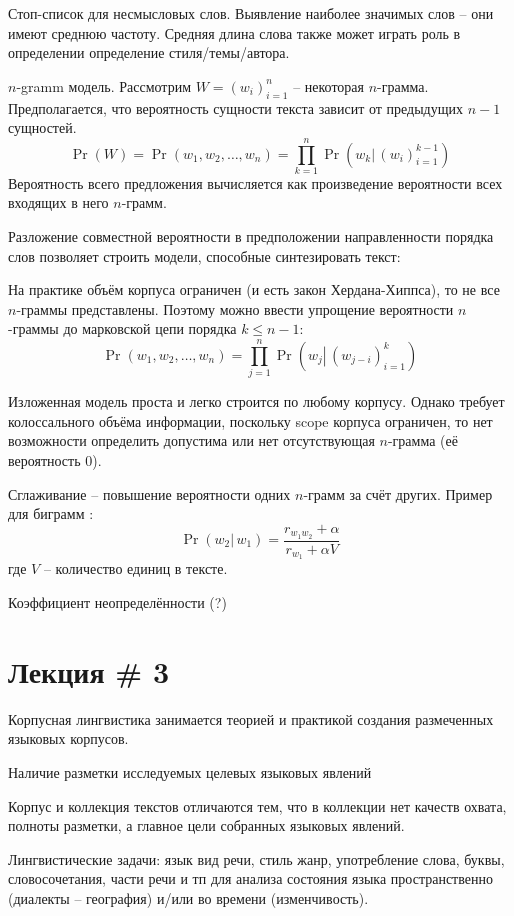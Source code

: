 \documentclass[a4paper]{article}
\newcommand{\brac}[1]{{\left ( #1 \right )}}
\newcommand{\induc}[1]{{\left . #1 \right \vert}}
\newcommand{\eng}[1]{\foreignlanguage{english}{#1}}
\begin{document}
Стоп-список для несмысловых слов.
Выявление наиболее значимых слов -- они имеют среднюю частоту.
Средняя длина слова также может играть роль в определении определение стиля/темы/автора.

$n$\eng{-gramm} модель.
Рассмотрим $W = \brac{w_i}_{i=1}^n$ -- некоторая $n$-грамма.
Предполагается, что вероятность сущности текста зависит от предыдущих $n-1$ сущностей.
\[ \Pr(W) = \Pr\brac{w_1,w_2,\ldots,w_n} = \prod_{k=1}^n \Pr\brac{\induc{w_k}\,\brac{w_i}_{i=1}^{k-1}}\]
Вероятность всего предложения вычисляется как произведение вероятности всех входящих в него $n$-грамм.

Разложение совместной вероятности в предположении направленности порядка слов позволяет строить модели, способные синтезировать текст:

На практике объём корпуса ограничен (и есть закон Хердана-Хиппса), то не все $n$-граммы представлены.
Поэтому можно ввести упрощение вероятности $n$-граммы до марковской цепи порядка $k\leq n-1$:
\[\Pr\brac{w_1,w_2,\ldots,w_n} = \prod_{j=1}^n \Pr\brac{\induc{w_j}\,\brac{w_{j-i}}_{i=1}^k}\]

Изложенная модель проста и легко строится по любому корпусу.
Однако требует колоссального объёма информации, поскольку \eng{scope} корпуса ограничен,
то нет возможности определить допустима или нет отсутствующая $n$-грамма (её вероятность $0$).

Сглаживание -- повышение вероятности одних $n$-грамм за счёт других.
Пример для биграмм : \[\Pr\brac{\induc{w_2}\, w_1} = \frac{r_{w_1w_2}+\alpha}{r_{w_1}+\alpha V}\]
где $V$ -- количество единиц в тексте.

Коэффициент неопределённости (?)



\section{Лекция \# 3} %
\label{sec:lecture_3}

Корпусная лингвистика занимается теорией и практикой создания размеченных языковых корпусов.

Наличие разметки исследуемых целевых языковых явлений

Корпус и коллекция текстов отличаются тем, что в коллекции нет качеств охвата, полноты разметки, а главное цели собранных языковых явлений.

Лингвистические задачи: язык вид речи, стиль жанр, употребление слова, буквы, словосочетания, части речи и тп для анализа состояния языка пространственно (диалекты -- география) и/или во времени (изменчивость).
\end{document}
